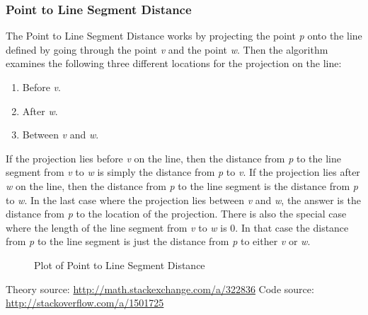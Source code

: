 		\subsubsection*{Point to Line Segment Distance}
			The Point to Line Segment Distance works by projecting the point \emph{p} onto the line 
			defined by going through the point \emph{v} and the point \emph{w}. Then the algorithm 
			examines the following three different locations for the projection on the line: 
			\begin{enumerate}
				\item Before \emph{v}.
				\item After \emph{w}.
				\item Between \emph{v} and \emph{w}.
			\end{enumerate}
			If the projection lies before \emph{v} on the line, then the distance from \emph{p} to 
			the line segment from \emph{v} to \emph{w} is simply the distance from \emph{p} to 
			\emph{v}. If the projection lies after \emph{w} on the line, then the distance from 
			\emph{p} to the line segment is the distance from \emph{p} to \emph{w}. In the last case 
			where the projection lies between \emph{v} and \emph{w}, the answer is the distance from 
			\emph{p} to the location of the projection. There is also the special case where the 
			length of the line segment from \emph{v} to \emph{w} is 0. In that case the distance 
			from \emph{p} to the line segment is just the distance from \emph{p} to either \emph{v} 
			or \emph{w}.

			\begin{figure}[H]
			\centering
			\caption{Plot of Point to Line Segment Distance}
			\end{figure}

			Theory source: \url{http://math.stackexchange.com/a/322836} \newline
			Code source: \url{http://stackoverflow.com/a/1501725} \newline


